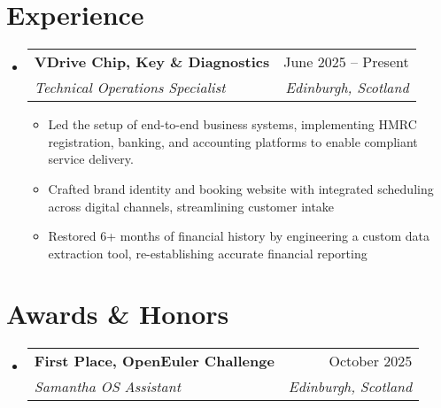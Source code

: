 \documentclass[letterpaper,11pt]{article}
\makeatletter
\newcommand{\resumeItem}[1]{
  \item\small{
    {#1 \vspace{-2pt}}
  }
}
\newcommand{\resumeSubheading}[4]{
  \vspace{-2pt}\item
    \begin{tabular*}{0.97\textwidth}[t]{l@{\extracolsep{\fill}}r}
      \textbf{#1} & #2 \\
      \textit{\small#3} & \textit{\small #4} \\
    \end{tabular*}\vspace{-7pt}
}
\newcommand{\resumeSubSubheading}[2]{
    \item
    \begin{tabular*}{0.97\textwidth}{l@{\extracolsep{\fill}}r}
      \textit{\small#1} & \textit{\small #2} \\
    \end{tabular*}\vspace{-7pt}
}
\newcommand{\resumeSubHeadingListStart}{\begin{itemize}[leftmargin=0.15in, label={}]}
\newcommand{\resumeSubHeadingListEnd}{\end{itemize}}
\newcommand{\resumeItemListStart}{\begin{itemize}}
\newcommand{\resumeItemListEnd}{\end{itemize}\vspace{-5pt}}
\makeatother
\begin{document}
\section{Experience}
\resumeSubHeadingListStart

\resumeSubheading
{VDrive Chip, Key \& Diagnostics}{June 2025 -- Present}
{Technical Operations Specialist}{Edinburgh, Scotland}
\resumeItemListStart
\resumeItem{Led the setup of end-to-end business systems, implementing HMRC registration, banking, and accounting platforms to enable compliant service delivery.}
\resumeItem{Crafted brand identity and booking website with integrated scheduling across digital channels, streamlining customer intake}
\resumeItem{Restored 6+ months of financial history by engineering a custom data extraction tool, re-establishing accurate financial reporting}
\resumeItemListEnd


\resumeSubHeadingListEnd



\section{Awards \& Honors}
\resumeSubHeadingListStart
\resumeSubheading
{First Place, OpenEuler Challenge}{October 2025}
{Samantha OS Assistant}{Edinburgh, Scotland}
\resumeSubHeadingListEnd

\end{document}
